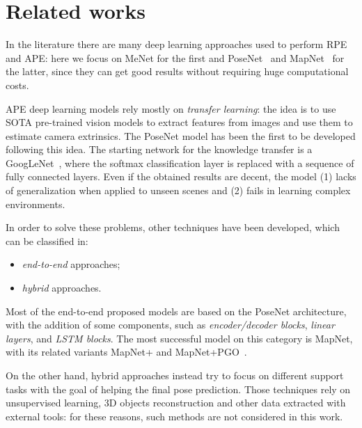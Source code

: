 \section{Related works}
In the literature there are many deep learning approaches used to perform RPE and APE: here we focus on MeNet for the first and PoseNet~\cite{9348762} and MapNet~\cite{mapnet} for the latter, since they can get good results without requiring huge computational costs.

APE deep learning models rely mostly on \emph{transfer learning}: the idea is to use SOTA pre-trained vision models to extract features from images and use them to estimate camera extrinsics.
The PoseNet model has been the first to be developed following this idea. The starting network for the knowledge transfer is a GoogLeNet~\cite{googlenet}, where the softmax classification layer is replaced with a sequence of fully connected layers. Even if the obtained results are decent, the model (1) lacks of generalization when applied to unseen scenes and (2) fails in learning complex environments.

In order to solve these problems, other techniques have been developed, which can be classified in:
\begin{itemize}
    \item \emph{end-to-end} approaches;
    \item \emph{hybrid} approaches.
\end{itemize}

Most of the end-to-end proposed models are based on the PoseNet architecture, with the addition of some components, such as \emph{encoder/decoder blocks}, \emph{linear layers}, and \emph{LSTM blocks}. The most successful model on this category is MapNet, with its related variants MapNet+ and MapNet+PGO~\cite{mapnet}.

On the other hand, hybrid approaches instead try to focus on different support tasks with the goal of helping the final pose prediction. Those techniques rely on unsupervised learning, 3D objects reconstruction and other data extracted with external tools: for these reasons, such methods are not considered in this work.
